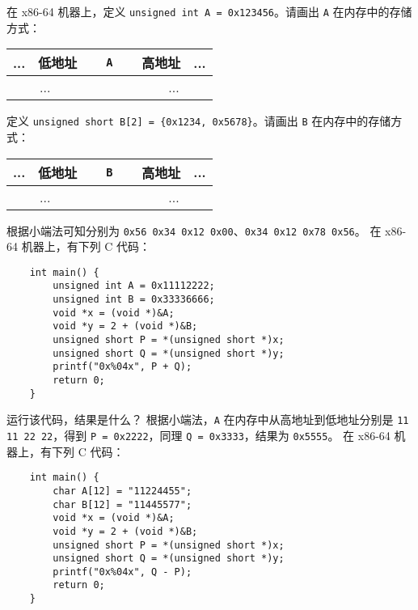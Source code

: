 	\begin{problems}
		\pro 在 x86-64 机器上，定义 \texttt{unsigned int A = 0x123456}。请画出 \texttt{A} 在内存中的存储方式：
		\begin{table}[H]
			\centering
			\begin{tabular}{|c|c|c|c|c|c|c|c|}
				\hline
				... & 低地址 & \multicolumn{4}{c|}{\texttt{A}} & 高地址 & ... \\ \hline
				\multicolumn{2}{|c|}{...} & {\qquad \qquad} & {\qquad \qquad} & {\qquad \qquad} & {\qquad \qquad} & \multicolumn{2}{c|}{...} \\ \hline
			\end{tabular}
		\end{table}
		定义 \texttt{unsigned short B[2] = \{0x1234, 0x5678\}}。请画出 \texttt{B} 在内存中的存储方式：
		\begin{table}[H]
			\centering
			\begin{tabular}{|c|c|c|c|c|c|c|c|}
				\hline
				... & 低地址 & \multicolumn{4}{c|}{\texttt{B}} & 高地址 & ... \\ \hline
				\multicolumn{2}{|c|}{...} & {\qquad \qquad} & {\qquad \qquad} & {\qquad \qquad} & {\qquad \qquad} & \multicolumn{2}{c|}{...} \\ \hline
			\end{tabular}
		\end{table}
		\sol 根据小端法可知分别为 \verb|0x56 0x34 0x12 0x00|、\verb|0x34 0x12 0x78 0x56|。
		\pro 在 x86-64 机器上，有下列 C 代码：
		\begin{verbatim}
    int main() {
        unsigned int A = 0x11112222;
        unsigned int B = 0x33336666;
        void *x = (void *)&A;
        void *y = 2 + (void *)&B;
        unsigned short P = *(unsigned short *)x;
        unsigned short Q = *(unsigned short *)y;
        printf("0x%04x", P + Q);
        return 0;
    }
		\end{verbatim}
		运行该代码，结果是什么？
		\sol 根据小端法，\verb|A| 在内存中从高地址到低地址分别是 \verb|11 11 22 22|，得到 \verb|P = 0x2222|，同理 \verb|Q = 0x3333|，结果为 \verb|0x5555|。
		\pro 在 x86-64 机器上，有下列 C 代码：
		\begin{verbatim}
    int main() {
        char A[12] = "11224455";
        char B[12] = "11445577";
        void *x = (void *)&A;
        void *y = 2 + (void *)&B;
        unsigned short P = *(unsigned short *)x;
        unsigned short Q = *(unsigned short *)y;
        printf("0x%04x", Q - P);
        return 0;
    }
		\end{verbatim}

\end{problems}
